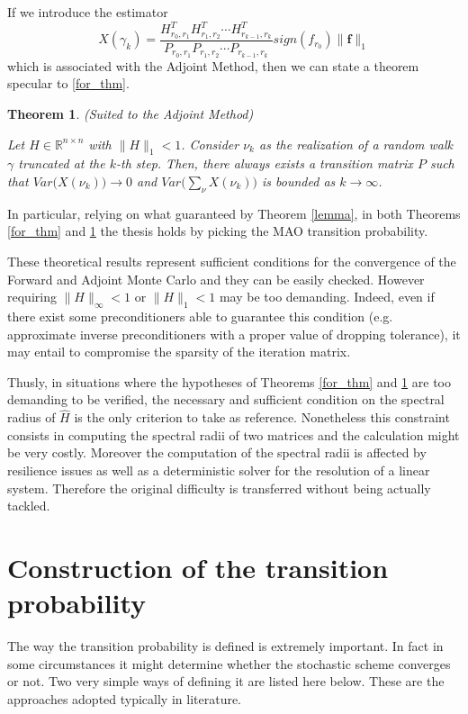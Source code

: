 \documentclass[a4paper,10pt]{article}
\newtheorem{thm}{Theorem}
\begin{document}
If we introduce the estimator
\[
 X(\gamma_k)=\frac{H^T_{r_0,r_1}H^T_{r_1,r_2}\cdots 
H^T_{r_{k-1},r_k}}{P_{r_0,r_1}P_{r_1,r_2}\cdots 
P_{r_{k-1},r_k}}sign(f_{r_0})\lVert \mathbf{f}\rVert_1
\]
which is associated with the Adjoint Method, then we can state a 
theorem specular to \ref{for_thm}.

\begin{thm}\textit{(Suited to the Adjoint Method)}

 Let $H\in \mathbb{R}^{n\times n}$ with $\lVert H\rVert_{1}<1$. 
Consider $\nu_k$ as the realization of a random walk $\gamma$ truncated at the 
$k$-th step. Then, 
there always exists a 
transition matrix $P$ such that 
$Var\Big(X(\nu_k)\Big)\rightarrow 0$ and 
$Var\Big(\sum_{\nu}X(\nu_k)\Big)$ is bounded as $k\rightarrow \infty$.
\label{adj_thm}
\end{thm}

In particular, relying on what guaranteed by Theorem \ref{lemma}, in both 
Theorems \ref{for_thm} and \ref{adj_thm} the thesis holds by picking the MAO 
transition probability.

These theoretical results represent sufficient conditions for the convergence 
of the  
Forward and Adjoint Monte Carlo and they can be easily checked. 
However requiring $\lVert 
H\rVert_{\infty}<1$ or $\lVert H\rVert_1<1$ may be too demanding. 
Indeed, even if there exist some preconditioners able to guarantee this 
condition (e.g. approximate inverse preconditioners with a proper value of 
dropping 
tolerance), it may entail to compromise the sparsity of the 
iteration 
matrix.

Thusly, in situations where the hypotheses of Theorems \ref{for_thm} and 
\ref{adj_thm} are too demanding to be verified, the necessary and sufficient 
condition 
on the 
spectral radius of $\hat{H}$ is the only criterion to take as reference.
Nonetheless this constraint consists in 
computing the spectral radii of two matrices and the calculation 
might be very costly. Moreover the computation of the spectral radii is 
affected by resilience issues as well as 
a deterministic solver for the resolution of 
a linear system. Therefore the original difficulty is transferred without being 
actually tackled.


\section{Construction of the transition probability}
The way the transition probability is defined is extremely important. In fact 
in some circumstances it might determine whether the stochastic scheme 
converges or not. Two very simple ways of defining it are listed here 
below. These are the approaches adopted typically in literature.
\end{document}
